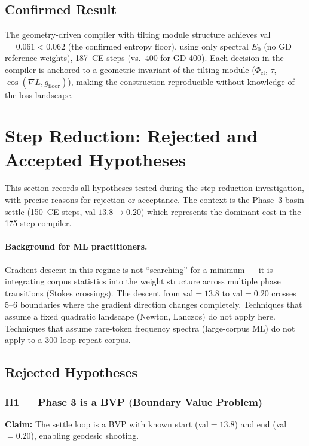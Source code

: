 \documentclass[11pt]{amsart}
\begin{document}
\subsection{Confirmed Result}

The geometry-driven compiler with tilting module structure achieves
val$=0.061 < 0.062$ (the confirmed entropy floor),
using only spectral $E_0$ (no GD reference weights),
187~CE steps (vs.\ 400 for GD-400).
Each decision in the compiler is anchored to a geometric invariant
of the tilting module ($\Phi_\mathrm{cl}$, $\tau$, $\cos(\nabla L, g_\mathrm{floor})$),
making the construction reproducible without knowledge of the loss landscape.

\section{Step Reduction: Rejected and Accepted Hypotheses}
\label{sec:hypotheses}

This section records all hypotheses tested during the step-reduction
investigation, with precise reasons for rejection or acceptance.
The context is the Phase~3 basin settle (150~CE steps, val $13.8 \to 0.20$)
which represents the dominant cost in the 175-step compiler.

\paragraph{Background for ML practitioners.}
Gradient descent in this regime is not ``searching'' for a minimum —
it is integrating corpus statistics into the weight structure across
multiple phase transitions (Stokes crossings).
The descent from val$=13.8$ to val$=0.20$ crosses 5--6 boundaries
where the gradient direction changes completely.
Techniques that assume a fixed quadratic landscape (Newton, Lanczos)
do not apply here.
Techniques that assume rare-token frequency spectra (large-corpus ML)
do not apply to a 300-loop repeat corpus.

\subsection{Rejected Hypotheses}

\subsubsection*{H1 — Phase 3 is a BVP (Boundary Value Problem)}

\textbf{Claim:} The settle loop is a BVP with known start (val$=13.8$)
and end (val$=0.20$), enabling geodesic shooting.
\end{document}
